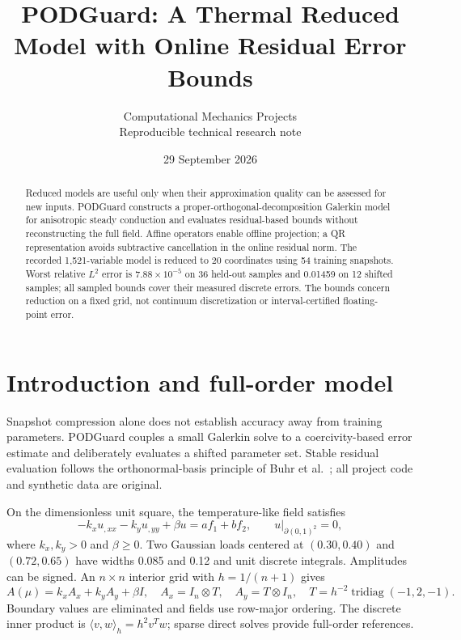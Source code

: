 \documentclass[10pt,a4paper]{article}
\title{\vspace{-1.3cm}\LARGE PODGuard: A Thermal Reduced Model with Online Residual Error Bounds}
\author{\small Computational Mechanics Projects\\\small Reproducible technical research note}
\date{\small 29 September 2026}
\begin{document}
\maketitle\thispagestyle{fancy}

\begin{abstract}
Reduced models are useful only when their approximation quality can be assessed for new inputs. PODGuard constructs a proper-orthogonal-decomposition Galerkin model for anisotropic steady conduction and evaluates residual-based bounds without reconstructing the full field. Affine operators enable offline projection; a QR representation avoids subtractive cancellation in the online residual norm. The recorded 1,521-variable model is reduced to 20 coordinates using 54 training snapshots. Worst relative $L^2$ error is $7.88\times10^{-5}$ on 36 held-out samples and 0.01459 on 12 shifted samples; all sampled bounds cover their measured discrete errors. The bounds concern reduction on a fixed grid, not continuum discretization or interval-certified floating-point error.
\end{abstract}
\section{Introduction and full-order model}
Snapshot compression alone does not establish accuracy away from training parameters. PODGuard couples a small Galerkin solve to a coercivity-based error estimate and deliberately evaluates a shifted parameter set. Stable residual evaluation follows the orthonormal-basis principle of Buhr et al.~\cite{buhr}; all project code and synthetic data are original.

On the dimensionless unit square, the temperature-like field satisfies
\begin{equation}
-k_xu_{,xx}-k_yu_{,yy}+\beta u=af_1+bf_2,\qquad u|_{\partial(0,1)^2}=0,
\end{equation}
where $k_x,k_y>0$ and $\beta\ge0$. Two Gaussian loads centered at $(0.30,0.40)$ and $(0.72,0.65)$ have widths 0.085 and 0.12 and unit discrete integrals. Amplitudes can be signed. An $n\times n$ interior grid with $h=1/(n+1)$ gives
\begin{equation}
A(\mu)=k_xA_x+k_yA_y+\beta I,\quad
A_x=I_n\otimes T,\quad A_y=T\otimes I_n,\quad
T=h^{-2}\operatorname{tridiag}(-1,2,-1).
\end{equation}
Boundary values are eliminated and fields use row-major ordering. The discrete inner product is $\langle v,w\rangle_h=h^2v^Tw$; sparse direct solves provide full-order references.
\end{document}
